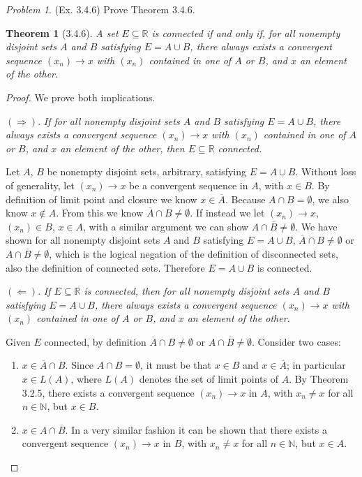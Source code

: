 \documentclass[11pt,twoside, reqno]{amsart}
\newtheorem{Thm}{Theorem}
\theoremstyle{remark}
\newtheorem{Prob}{Problem}
\def\R{\mathbb R}
\def\N{\mathbb N}
\renewcommand{\implies}{\Rightarrow}
\newcommand{\implied}{\Leftarrow}
\begin{document}
\begin{Prob}(Ex. 3.4.6) Prove Theorem 3.4.6.
\begin{Thm}[3.4.6]
A set $E \subseteq \R$ is connected if and only if, for all nonempty disjoint sets $A$ and $B$ satisfying $E = A \cup B$, there always exists a convergent sequence $(x_n) \to x$ with $(x_n)$ contained in one of $A$ or $B$, and $x$ an element of the other.
\end{Thm}
\end{Prob}

\begin{proof}
We prove both implications.

$(\implies)$. \textit{If for all nonempty disjoint sets $A$ and $B$ satisfying $E = A \cup B$, there always exists a convergent sequence $(x_n) \to x$ with $(x_n)$ contained in one of $A$ or $B$, and $x$ an element of the other, then $E \subseteq \R$ connected.}

Let $A$, $B$ be nonempty disjoint sets, arbitrary, satisfying $E = A \cup B$. Without loss of generality, let $(x_n) \to x$ be a convergent sequence in $A$, with $x \in B$. By definition of limit point and closure we know $x \in \overline{A}$. Because $A \cap B = \emptyset$, we also know $x \not \in A$. From this we know $\overline{A} \cap B \neq \emptyset$. If instead we let $(x_n) \to x$, $(x_n) \in B$, $x \in A$, with a similar argument we can show $A \cap \overline{B} \neq \emptyset$. We have shown for all nonempty disjoint sets $A$ and $B$ satisfying $E = A \cup B$, $\overline{A} \cap B \neq \emptyset$ or $A \cap \overline{B} \neq \emptyset$, which is the logical negation of the definition of disconnected sets, also the definition of connected sets. Therefore $E = A \cup B$ is connected.

$(\implied)$. \textit{If $E \subseteq \R$ is connected, then for all nonempty disjoint sets $A$ and $B$ satisfying $E = A \cup B$, there always exists a convergent sequence $(x_n) \to x$ with $(x_n)$ contained in one of $A$ or $B$, and $x$ an element of the other.}

Given $E$ connected, by definition $\overline{A} \cap B \neq \emptyset$ or $A \cap \overline{B} \neq \emptyset$. Consider two cases:
\begin{enumerate}
    \item $x \in \overline{A} \cap B$. Since $A \cap B = \emptyset$, it must be that $x \in B$ and $x \in \overline{A}$; in particular $x \in L(A)$, where $L(A)$ denotes the set of limit points of $A$. By Theorem 3.2.5, there exists a convergent sequence $(x_n) \to x$ in $A$, with $x_n \neq x$ for all $n \in \N$, but $x \in B$.
    \item $x \in A \cap \overline{B}$. In a very similar fashion it can be shown that there exists a convergent sequence $(x_n) \to x$ in $B$, with $x_n \neq x$ for all $n \in \N$, but $x \in A$.
\end{enumerate}

\end{proof}
\end{document}
